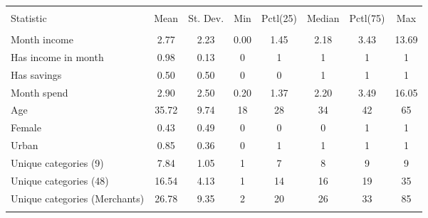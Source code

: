 
\begin{tabular}{@{\extracolsep{5pt}}lccccccc} 
\\[-1.8ex]\hline 
\hline \\[-1.8ex] 
Statistic & \multicolumn{1}{c}{Mean} & \multicolumn{1}{c}{St. Dev.} & \multicolumn{1}{c}{Min} & \multicolumn{1}{c}{Pctl(25)} & \multicolumn{1}{c}{Median} & \multicolumn{1}{c}{Pctl(75)} & \multicolumn{1}{c}{Max} \\ 
\hline \\[-1.8ex] 
Month income & 2.77 & 2.23 & 0.00 & 1.45 & 2.18 & 3.43 & 13.69 \\ 
Has income in month & 0.98 & 0.13 & 0 & 1 & 1 & 1 & 1 \\ 
Has savings & 0.50 & 0.50 & 0 & 0 & 1 & 1 & 1 \\ 
Month spend & 2.90 & 2.50 & 0.20 & 1.37 & 2.20 & 3.49 & 16.05 \\ 
Age & 35.72 & 9.74 & 18 & 28 & 34 & 42 & 65 \\ 
Female & 0.43 & 0.49 & 0 & 0 & 0 & 1 & 1 \\ 
Urban & 0.85 & 0.36 & 0 & 1 & 1 & 1 & 1 \\ 
Unique categories (9) & 7.84 & 1.05 & 1 & 7 & 8 & 9 & 9 \\ 
Unique categories (48) & 16.54 & 4.13 & 1 & 14 & 16 & 19 & 35 \\ 
Unique categories (Merchants) & 26.78 & 9.35 & 2 & 20 & 26 & 33 & 85 \\ 
\hline \\[-1.8ex] 
\end{tabular} 
